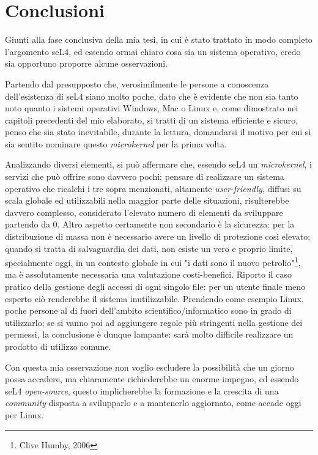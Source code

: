 \chapter{Conclusioni}
Giunti alla fase conclusiva della mia tesi, in cui è stato trattato in modo completo l'argomento seL4, ed essendo ormai chiaro cosa sia un sistema operativo, credo sia opportuno proporre alcune osservazioni.

Partendo dal presupposto che, verosimilmente le persone a conoscenza dell'esistenza di seL4 siano molto poche, dato che è evidente che non sia tanto noto quanto i sistemi operativi Windows, Mac o Linux e, come dimostrato nei capitoli precedenti del mio elaborato, si tratti di un sistema efficiente e sicuro, penso che sia stato inevitabile, durante la lettura, domandarsi il motivo per cui si sia sentito nominare questo \textit{microkernel} per la prima volta.

Analizzando diversi elementi, si può affermare che, essendo seL4 un \textit{microkernel}, i servizi che può offrire sono davvero pochi; pensare di realizzare un sistema operativo che ricalchi i tre sopra menzionati, altamente \textit{user-friendly}, diffusi su scala globale ed utilizzabili nella maggior parte delle situazioni, risulterebbe davvero complesso, considerato l'elevato numero di elementi da sviluppare partendo da 0. Altro aspetto certamente non secondario è la sicurezza: per la distribuzione di massa non è necessario avere un livello di protezione così elevato; quando si tratta di salvaguardia dei dati, non esiste un vero e proprio limite, specialmente oggi, in un contesto globale in cui "i dati sono il nuovo petrolio"\footnote{Clive Humby, 2006}, ma è assolutamente necessaria una valutazione costi-benefici. Riporto il caso pratico della gestione degli accessi di ogni singolo file: per un utente finale meno esperto ciò renderebbe il sistema inutilizzabile. Prendendo come esempio Linux, poche persone al di fuori dell'ambito scientifico/informatico sono in grado di utilizzarlo; se si vanno poi ad aggiungere regole più stringenti nella gestione dei permessi, la conclusione è dunque lampante: sarà molto difficile realizzare un prodotto di utilizzo comune.

Con questa mia osservazione non voglio escludere la possibilità che un giorno possa accadere, ma chiaramente richiederebbe un enorme impegno, ed essendo seL4 \textit{open-source}, questo implicherebbe la formazione e la crescita di una \textit{community} disposta a svilupparlo e a mantenerlo aggiornato, come accade oggi per Linux.

